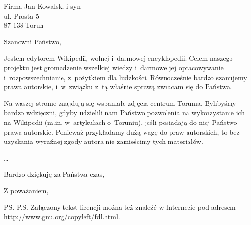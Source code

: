 \documentclass{letter}
\begin{document}
\begin{letter}{Firma Jan Kowalski i syn\\ul. Prosta 5\\87-138 Toruń}
\opening{Szanowni Państwo,}
Jestem edytorem Wikipedii, wolnej i~darmowej encyklopedii. Celem naszego projektu
jest gromadzenie wszelkiej wiedzy i~darmowe jej opracowywanie i~rozpowszechnianie,
z~pożytkiem dla ludzkości. Równocześnie bardzo szanujemy prawa autorskie, i~w~związku
z~tą właśnie sprawą zwracam się do Państwa.

Na waszej stronie znajdują się wspaniałe zdjęcia centrum Torunia. Bylibyśmy bardzo
wdzięczni, gdyby udzielili nam Państwo pozwolenia na wykorzystanie ich na Wikipedii
(m.in. w~artykułach o~Toruniu), jeśli posiadają do niej Państwo prawa autorskie.
Ponieważ przykładamy dużą wagę do praw autorskich, to bez uzyskania wyraźnej zgody
autora nie zamieścimy tych materiałów.

\ldots

Bardzo dziękuję za Państwa czas,

\closing{Z poważaniem,}
\ps{P.S. Załączony tekst licencji można też znaleźć w Internecie pod adresem
\url{http://www.gnu.org/copyleft/fdl.html}.}
\end{letter}
\end{document}
